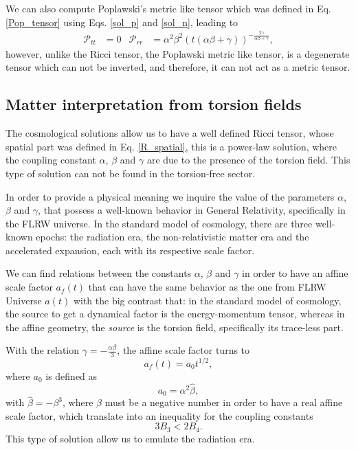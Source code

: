 We can also compute Poplawski's metric like tensor which 
was defined in Eq. \eqref{Pop_tensor} using Eqs. \eqref{sol_p} and \eqref{sol_n}, leading to
\begin{align}
    \mathcal{P}_{tt} & = 0 & \mathcal{P}_{rr} & = \alpha^2\beta^2\left(t\left(\alpha\beta + \gamma\right)\right)^{-\frac{2\gamma}{\alpha\beta + \gamma}},
\end{align}
however, unlike the Ricci tensor, the Poplawski metric like tensor, is a 
degenerate tensor which can not be inverted, and therefore, it can not
act as a metric tensor.

\subsection{Matter interpretation from torsion fields}

The cosmological solutions allow us to have a well defined Ricci tensor, whose
spatial part was defined in Eq. \eqref{R_spatial}, this is a power-law solution,
where the coupling constant $\alpha$, $\beta$ and $\gamma$ are due to the presence 
of the torsion field. This type of solution can not be found in the torsion-free sector.

In order to provide a physical meaning we inquire the value of the parameters $\alpha$, 
$\beta$ and $\gamma$, that possess a well-known behavior in General Relativity, 
specifically in the FLRW universe. In the standard model of cosmology, there are
three well-known epochs: the radiation era, the non-relativistic matter era and the
accelerated expansion, each with its respective scale factor. 

We can find relations between the constants $\alpha$, $\beta$ and $\gamma$ in order
to have an affine scale factor $a_f(t)$ that can have the same behavior as the one from
FLRW Universe $a(t)$ with the big contrast that: in the standard model of cosmology,
the source to get a dynamical factor is the energy-momentum tensor, whereas in the
affine geometry, the \textit{source} is the torsion field, specifically its trace-less
part.

With the relation $\gamma = -\frac{\alpha\beta}{3}$, the affine scale factor turns to
\begin{equation}
    a_f(t) = a_0 t^{1/2},
\end{equation}
where $a_0$ is defined as 
\begin{equation}
    a_0 = \alpha^2 \hat{\beta},
\end{equation}
with $\hat{\beta} = -\beta^3$, where $\beta$ must be a negative number in order to have 
a real affine scale factor, which translate into an inequality for the coupling constants
\begin{equation}
    \label{constraint}
    3B_3 < 2B_4.
\end{equation}
This type of solution allow us to emulate the radiation era. 

